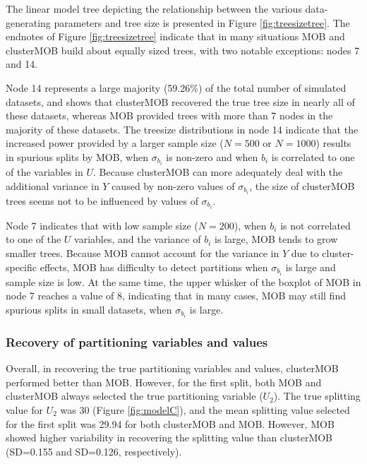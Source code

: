 \documentclass[nobf,man]{apa}
\begin{document}
The linear model tree depicting the relationship between the various data-generating parameters and tree size is presented in Figure \ref{fig:treesizetree}. The endnotes of Figure \ref{fig:treesizetree} indicate that in many situations MOB and clusterMOB build about equally sized trees, with two notable exceptions: nodes 7 and 14. 

Node 14 represents a large majority (59.26\%) of the total number of simulated datasets, and shows that clusterMOB recovered the true tree size in nearly all of these datasets, whereas MOB provided trees with more than 7 nodes in the majority of these datasets. The treesize distributions in node 14 indicate that the increased power provided by a larger sample size ($N=500$ or $N=1000$) results in spurious splits by MOB, when $\sigma_{b_i}$ is non-zero and when $b_i$ is correlated to one of the variables in $U$. Because clusterMOB can more adequately deal with the additional variance in $Y$ caused by non-zero values of $\sigma_{b_i}$, the size of clusterMOB trees seems not to be influenced by values of $\sigma_{b_i}$.

Node 7 indicates that with low sample size ($N=200$), when $b_i$ is not correlated to one of the $U$ variables, and the variance of $b_i$ is large, MOB tends to grow smaller trees. Because MOB cannot account for the variance in $Y$ due to cluster-specific effects, MOB has difficulty to detect partitions when $\sigma_{b_i}$ is large and sample size is low. At the same time, the upper whisker of the boxplot of MOB in node 7 reaches a value of 8, indicating that in many cases, MOB may still find spurious splits in small datasets, when $\sigma_{b_i}$ is large. 



\subsubsection{Recovery of partitioning variables and values}

Overall, in recovering the true partitioning variables and values, clusterMOB performed better than MOB. However, for the first split, both MOB and clusterMOB always selected the true partitioning variable ($U_2$). The true splitting value for $U_2$ was 30 (Figure \ref{fig:modelC}), and the mean splitting value selected for the first split was 29.94 for both clusterMOB and MOB. However, MOB showed higher variability in recovering the splitting value than clusterMOB (SD=0.155 and SD=0.126, respectively).
\end{document}
